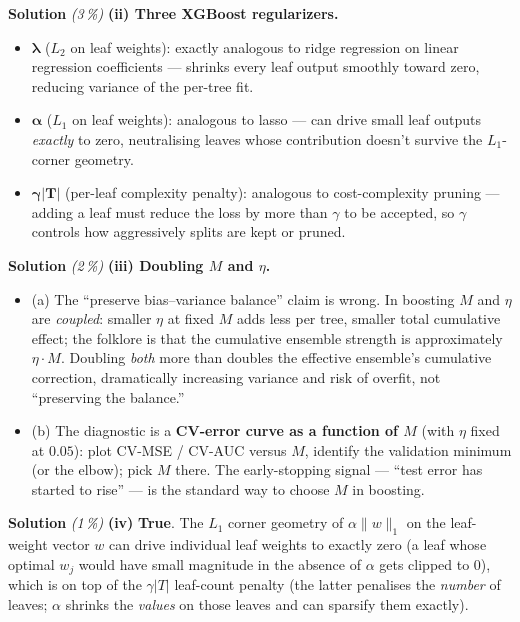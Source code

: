 \documentclass[11pt,a4paper]{article}
\newcommand{\subpoints}[1]{\textit{(#1\,\%)}}
\newcommand{\sol}{\noindent\textbf{Solution}}
\begin{document}
\medskip
\sol{} \subpoints{3} \textbf{(ii) Three XGBoost regularizers.}
\begin{itemize}
  \item $\bm{\lambda}$ ($L_2$ on leaf weights): exactly analogous to ridge regression on linear
        regression coefficients --- shrinks every leaf output smoothly toward zero, reducing
        variance of the per-tree fit.
  \item $\bm{\alpha}$ ($L_1$ on leaf weights): analogous to lasso --- can drive small leaf outputs
        \emph{exactly} to zero, neutralising leaves whose contribution doesn't survive the
        $L_1$-corner geometry.
  \item $\bm{\gamma|T|}$ (per-leaf complexity penalty): analogous to cost-complexity pruning ---
        adding a leaf must reduce the loss by more than $\gamma$ to be accepted, so $\gamma$
        controls how aggressively splits are kept or pruned.
\end{itemize}

\medskip
\sol{} \subpoints{2} \textbf{(iii) Doubling $M$ and $\eta$.}
\begin{itemize}
  \item (a) The ``preserve bias--variance balance'' claim is wrong. In boosting $M$ and $\eta$ are
        \emph{coupled}: smaller $\eta$ at fixed $M$ adds less per tree, smaller total cumulative
        effect; the folklore is that the cumulative ensemble strength is approximately
        $\eta\cdot M$. Doubling \emph{both} more than doubles the effective ensemble's
        cumulative correction, dramatically increasing variance and risk of overfit, not
        ``preserving the balance.''
  \item (b) The diagnostic is a \textbf{CV-error curve as a function of $M$} (with $\eta$ fixed at
        $0.05$): plot CV-MSE / CV-AUC versus $M$, identify the validation minimum (or the elbow);
        pick $M$ there. The early-stopping signal --- ``test error has started to rise'' --- is
        the standard way to choose $M$ in boosting.
\end{itemize}

\medskip
\sol{} \subpoints{1} \textbf{(iv)} \textbf{True}. The $L_1$ corner geometry of $\alpha\|w\|_1$ on
the leaf-weight vector $w$ can drive individual leaf weights to exactly zero (a leaf whose
optimal $w_j$ would have small magnitude in the absence of $\alpha$ gets clipped to $0$), which is
on top of the $\gamma|T|$ leaf-count penalty (the latter penalises the \emph{number} of leaves;
$\alpha$ shrinks the \emph{values} on those leaves and can sparsify them exactly).
\end{document}
